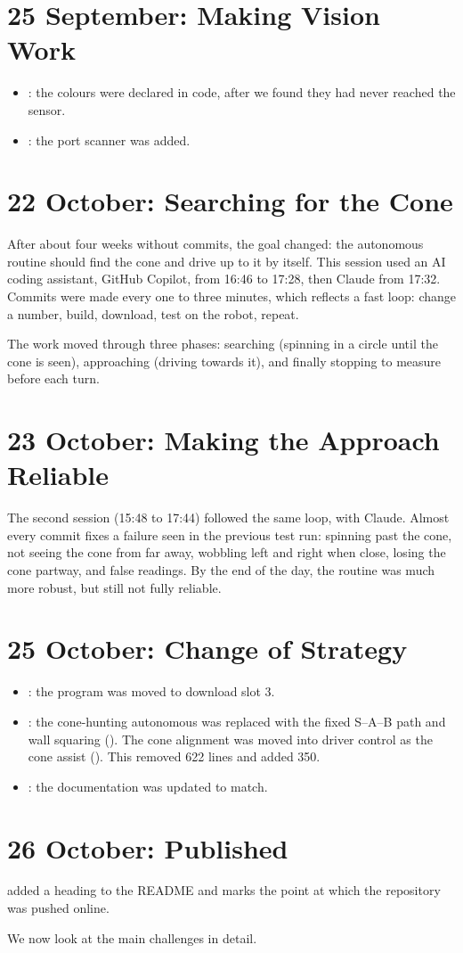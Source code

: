 \section{25 September: Making Vision Work}

\begin{itemize}
  \item {}: the colours were declared in code, after we found they
    had never reached the sensor.
  \item {}: the port scanner was added.
\end{itemize}

\section{22 October: Searching for the Cone}

After about four weeks without commits, the goal changed: the autonomous routine
should find the cone and drive up to it by itself. This session used an AI coding
assistant, GitHub Copilot, from 16:46 to 17:28, then Claude from 17:32. Commits
were made every one to three minutes, which reflects a fast loop: change a
number, build, download, test on the robot, repeat.

The work moved through three phases: searching (spinning in a circle until the
cone is seen), approaching (driving towards it), and finally stopping to measure
before each turn.

\section{23 October: Making the Approach Reliable}

The second session (15:48 to 17:44) followed the same loop, with Claude. Almost
every commit fixes a failure seen in the previous test run: spinning past the
cone, not seeing the cone from far away, wobbling left and right when close,
losing the cone partway, and false readings. By the end of the day, the routine
was much more robust, but still not fully reliable.

\section{25 October: Change of Strategy}

\begin{itemize}
  \item {}: the program was moved to download slot 3.
  \item {}: the cone-hunting autonomous was replaced with the fixed
    S--A--B path and wall squaring (). The cone alignment was
    moved into driver control as the cone assist (). This
    removed 622 lines and added 350.
  \item {}: the documentation was updated to match.
\end{itemize}

\section{26 October: Published}

 added a heading to the README and marks the point at which the
repository was pushed online.

We now look at the main challenges in detail.
